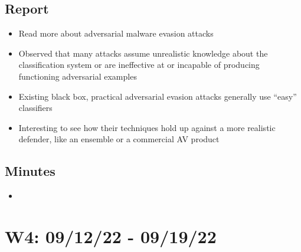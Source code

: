 \documentclass{article}
\begin{document}
\subsection*{Report}

\begin{itemize}
	\item Read more about adversarial malware evasion attacks
	\item Observed that many attacks assume unrealistic knowledge about the classification system or are ineffective at or incapable of producing functioning adversarial examples
	\item Existing black box, practical adversarial evasion attacks generally use ``easy'' classifiers
	\item Interesting to see how their techniques hold up against a more realistic defender, like an ensemble or a commercial AV product
\end{itemize}

\subsection*{Minutes}

\begin{itemize}
	\item 
\end{itemize}

\pagebreak


\section*{W4: 09/12/22 - 09/19/22}
\end{document}
